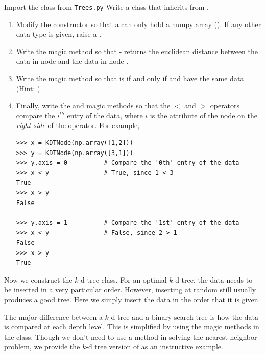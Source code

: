 \begin{problem}
Import the  class from \texttt{Trees.py}%
Write a  class that inherits from .
\begin{enumerate}
\item Modify the constructor so that a  can only hold a numpy array ().
If any other data type is given, raise a .
\item Write the  magic method so that  -  returns the euclidean distance between the data in node  and the data in node .

\item Write the  magic method so that  is  if and only if  and  have the same data (Hint: )

\item Finally, write the  and  magic methods so that the $<$ and $>$ operators compare the $i^{th}$ entry of the data, where $i$ is the  attribute of the node on the \emph{right side} of the operator.
For example,

\begin{lstlisting}
>>> x = KDTNode(np.array([1,2]))
>>> y = KDTNode(np.array([3,1]))
>>> y.axis = 0			# Compare the '0th' entry of the data 
>>> x < y				# True, since 1 < 3
True
>>> x > y
False

>>> y.axis = 1			# Compare the '1st' entry of the data
>>> x < y				# False, since 2 > 1
False
>>> x > y
True
\end{lstlisting}
\end{enumerate}
\end{problem}

Now we construct the $k$-d tree class.
For an optimal $k$-d tree, the data needs to be inserted in a very particular order.
However, inserting at random still usually produces a good tree.
Here we simply insert the data in the order that it is given.

The major difference between a $k$-d tree and a binary search tree is how the data is compared at each depth level.
This is simplified by using the magic methods in the  class.
Though we don't need to use a  method in solving the nearest neighbor problem, we provide the $k$-d tree version of  as an instructive example.


